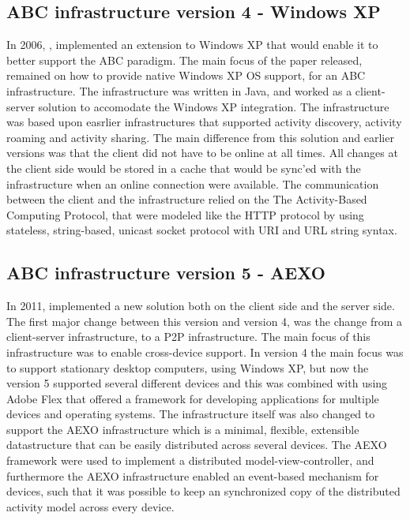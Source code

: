 \subsection{ABC infrastructure version 4 - Windows XP}
In 2006, \citet{bardram2006}, implemented an extension to Windows XP that would enable it to better support the ABC paradigm. The main focus of the paper released, remained on how to provide native Windows XP OS support, for an ABC infrastructure. The infrastructure was written in Java, and worked as a client-server solution to accomodate the Windows XP integration. The infrastructure was based upon easrlier infrastructures that supported activity discovery, activity roaming and activity sharing. The main difference from this solution and earlier versions was that the client did not have to be online at all times. All changes at the client side would be stored in a cache that would be sync'ed with the infrastructure when an online connection were available. The communication between the client and the infrastructure relied on the The Activity-Based Computing Protocol, that were modeled like the HTTP protocol by using stateless, string-based, unicast socket protocol with URI and URL string syntax.

\subsection{ABC infrastructure version 5 - AEXO}
In 2011, \citet{bardram2012} implemented a new solution both on the client side and the server side. The first major change between this version and version 4, was the change from a client-server infrastructure, to a P2P infrastructure. The main focus of this infrastructure was to enable cross-device support. In version 4 the main focus was to support stationary desktop computers, using Windows XP, but now the version 5 supported several different devices and this was combined with using Adobe Flex that offered a framework for developing applications for multiple devices and operating systems. The infrastructure itself was also changed to support the AEXO infrastructure which is a minimal, flexible, extensible datastructure that can be easily distributed across several devices. The AEXO framework were used to implement a distributed model-view-controller, and furthermore the AEXO infrastructure enabled an event-based mechanism for devices, such that it was possible to keep an synchronized copy of the distributed activity model across every device.

